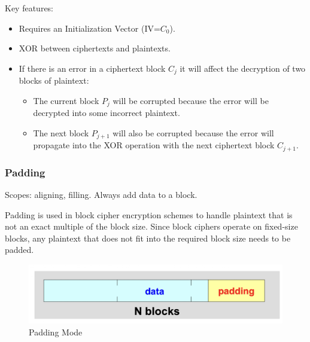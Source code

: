 Key features:
\begin{itemize}
    \item Requires an Initialization Vector (IV=$C_0$).
    \item XOR between ciphertexts and plaintexts.
    \item If there is an error in a ciphertext block $C_j$ it will affect the decryption of two blocks of plaintext:
    \begin{itemize}
        \item The current block $P_j$ will be corrupted because the error will be decrypted into some incorrect plaintext. 
        \item The next block  $P_{j+1}$  will also be corrupted because the error will propagate into the XOR operation with the next ciphertext block  $C_{j+1}$.
    \end{itemize} 
\end{itemize}

\clearpage

\subsubsection{Padding}
\begin{center}
    Scopes: aligning, filling. Always add data to a block.
\end{center}

Padding is used in block cipher encryption schemes to handle plaintext that is not an exact multiple of the block size. Since block ciphers operate on fixed-size blocks, any plaintext that does not fit into the required block size needs to be padded.
\begin{figure}[H]
    \centering
    \includegraphics[width=0.5\linewidth]{Images/Cryptography/padding.png}
    \caption{Padding Mode}
    
\end{figure}

